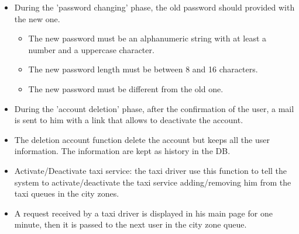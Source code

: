 \begin{itemize}
		\item During the 'password changing' phase, the old password should provided with the new one.
		\begin{itemize}
			\item The new password must be an alphanumeric string with at least a number and a uppercase character.
			\item The new password length must be between 8 and 16 characters. 
			\item The new password must be different from the old one.
		\end{itemize}
		\item During the 'account deletion' phase, after the confirmation of the user, a mail is sent to him with a link that allows to deactivate the account.
		\item The deletion account function delete the account but keeps all the user information. The information are kept as history in the DB.
		\item Activate/Deactivate taxi service: the taxi driver use this function to tell the system to activate/deactivate the taxi service adding/removing him from the taxi queues in the city zones.
		\item A request received by a taxi driver is displayed in his main page for one minute, then it is passed to the next user in the city zone queue.
	\end{itemize}